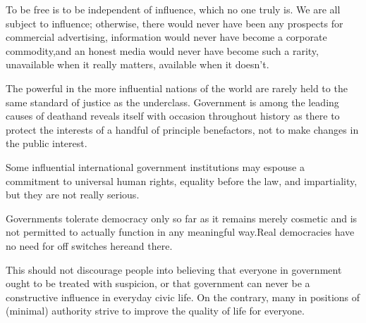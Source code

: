 To be free is to be independent of influence, which no one truly is. We are all subject to influence; otherwise, there would never have been any prospects for commercial advertising, information would never have become a corporate commodity,\footnotecite[santoso2008]\footnotecite[nagata2011] and an honest media would never have become such a rarity, unavailable when it really matters,
available when it doesn't.


The powerful in the more influential nations of the world are rarely held to the same standard of justice as the underclass.
Government is among the leading causes of death and reveals itself with occasion throughout history as there to protect the interests of a handful of principle benefactors,
\footnotecite[wilson2007]
\footnotecite[bowie2012]
\footnotecite[favel2008]
not to make changes in the public interest.

Some influential international government institutions may espouse a commitment to universal human rights, equality before the law, and impartiality, but they are not really serious.

Governments tolerate democracy only so far as it remains merely cosmetic and is not permitted to actually function in any meaningful way. Real democracies have no need for off switches here and there. 

This should not discourage people into believing that everyone in government ought to be treated with suspicion, or that government can never be a constructive influence in everyday civic life. On the contrary, many in positions of (minimal) authority strive to improve the quality of life for everyone.

